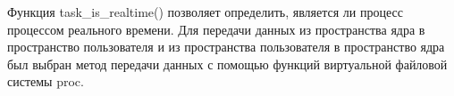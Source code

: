 Функция task\_is\_realtime() позволяет определить, является ли процесс процессом реального времени. Для передачи данных из пространства ядра в пространство пользователя и из пространства пользователя в пространство ядра был выбран метод передачи данных с помощью функций виртуальной файловой системы proc.



